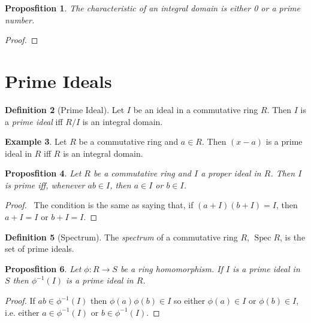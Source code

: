 \documentclass{book}
\let\qed\relax
\newtheorem{prop}{Proposfition}[chapter]
\theoremstyle{definition}
\newtheorem{df}[prop]{Definition}
\newtheorem{ex}[prop]{Example}
\newcommand{\inv}[1]{\ensuremath{{#1}^{-1}}}
\newcommand{\Spec}{\ensuremath{\operatorname{Spec}}}
\begin{document}
\begin{prop}
The characteristic of an integral domain is either 0 or a prime number.
\end{prop}

\begin{proof}
\pf
{}
\qed
\end{proof}

\section{Prime Ideals}

\begin{df}[Prime Ideal]
Let $I$ be an ideal in a commutative ring $R$. Then $I$ is a \emph{prime ideal} iff $R/I$ is an integral domain.
\end{df}

\begin{ex}
Let $R$ be a commutative ring and $a \in R$. Then $(x-a)$ is a prime ideal in $R$ iff $R$ is an integral domain.
\end{ex}

\begin{prop}
Let $R$ be a commutative ring and $I$ a proper ideal in $R$. Then $I$ is prime iff, whenever $ab \in I$, then $a \in I$ or $b \in I$.
\end{prop}

\begin{proof}
\pf\ The condition is the same as saying that, if $(a+I)(b+I) = I$, then $a+I = I$ or $b+I = I$. \qed
\end{proof}

\begin{df}[Spectrum]
The \emph{spectrum} of a commutative ring $R$, $\Spec R$, is the set of prime ideals.
\end{df}

\begin{prop}
Let $\phi : R \rightarrow S$ be a ring homomorphism. If $I$ is a prime ideal in $S$ then $\inv{\phi}(I)$ is a prime ideal in $R$.
\end{prop}

\begin{proof}
\pf
If $ab \in \inv{\phi}(I)$ then $\phi(a)\phi(b) \in I$ so either $\phi(a) \in I$ or $\phi(b) \in I$, i.e. either $a \in \inv{\phi}(I)$ or $b \in \inv{\phi}(I)$. \qed
\end{proof}
\end{document}
